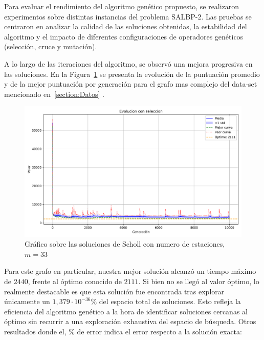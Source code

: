 \documentclass[12pt,a4paper]{report}
\begin{document}
Para evaluar el rendimiento del algoritmo genético propuesto, se realizaron experimentos sobre distintas instancias del problema SALBP-2. Las pruebas se centraron en analizar la calidad de las soluciones obtenidas, la estabilidad del algoritmo y el impacto de diferentes configuraciones de operadores genéticos (selección, cruce y mutación).

A lo largo de las iteraciones del algoritmo, se observó una mejora progresiva en las soluciones. En la Figura~\ref{fig:evolucion-punt} se presenta la evolución de la puntuación promedio y de la mejor puntuación por generación para el grafo mas complejo del data-set mencionado en~\ref{section:Datos} .

\begin{figure}[H]
        \centering
        \includegraphics[width=\linewidth]{DATA/scholl_M33.png}
        \caption{Gráfico sobre las soluciones de Scholl con numero de estaciones, $m=33$}
        \label{fig:evolucion-punt}
\end{figure}
Para este grafo en particular, nuestra mejor solución alcanzó un tiempo máximo de $2440$, frente al óptimo conocido de $2111$. Si bien no se llegó al valor óptimo, lo realmente destacable es que esta solución fue encontrada tras explorar únicamente un $1{,}379 \cdot 10^{-36}\%$ del espacio total de soluciones. Esto refleja la eficiencia del algoritmo genético a la hora de identificar soluciones cercanas al óptimo sin recurrir a una exploración exhaustiva del espacio de búsqueda. 
Otros resultados donde el, $\%$ de error indica el error respecto a la solución exacta:
\end{document}
